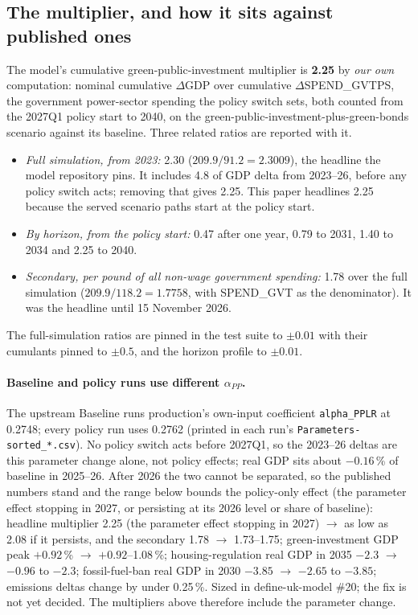 \subsection{The multiplier, and how it sits against published ones}
\label{sec:multiplier}

The model's cumulative green-public-investment multiplier is \textbf{2.25} by \emph{our own} computation: nominal cumulative $\Delta$GDP over cumulative $\Delta$SPEND\_GVTPS, the government power-sector spending the policy switch sets, both counted from the 2027Q1 policy start to 2040, on the green-public-investment-plus-green-bonds scenario against its baseline. Three related ratios are reported with it.

\begin{itemize}
\item \emph{Full simulation, from 2023:} 2.30 ($209.9/91.2 = 2.3009$), the headline the model repository pins. It includes 4.8 of GDP delta from 2023--26, before any policy switch acts; removing that gives 2.25. This paper headlines 2.25 because the served scenario paths start at the policy start.
\item \emph{By horizon, from the policy start:} 0.47 after one year, 0.79 to 2031, 1.40 to 2034 and 2.25 to 2040.
\item \emph{Secondary, per pound of all non-wage government spending:} 1.78 over the full simulation ($209.9/118.2 = 1.7758$, with SPEND\_GVT as the denominator). It was the headline until 15 November 2026.
\end{itemize}

The full-simulation ratios are pinned in the test suite to $\pm0.01$ with their cumulants pinned to $\pm0.5$, and the horizon profile to $\pm0.01$.

\paragraph{Baseline and policy runs use different $\alpha_{PP}$.} The upstream Baseline runs production's own-input coefficient \texttt{alpha\_PPLR} at 0.2748; every policy run uses 0.2762 (printed in each run's \texttt{Parameters-sorted\_*.csv}). No policy switch acts before 2027Q1, so the 2023--26 deltas are this parameter change alone, not policy effects; real GDP sits about $-0.16$\,\% of baseline in 2025--26. After 2026 the two cannot be separated, so the published numbers stand and the range below bounds the policy-only effect (the parameter effect stopping in 2027, or persisting at its 2026 level or share of baseline): headline multiplier 2.25 (the parameter effect stopping in 2027) $\rightarrow$ as low as 2.08 if it persists, and the secondary 1.78 $\rightarrow$ 1.73--1.75; green-investment GDP peak $+0.92$\,\% $\rightarrow$ $+0.92$--1.08\,\%; housing-regulation real GDP in 2035 $-2.3$ $\rightarrow$ $-0.96$ to $-2.3$; fossil-fuel-ban real GDP in 2030 $-3.85$ $\rightarrow$ $-2.65$ to $-3.85$; emissions deltas change by under 0.25\,\%. Sized in define-uk-model \#20; the fix is not yet decided. The multipliers above therefore include the parameter change.

